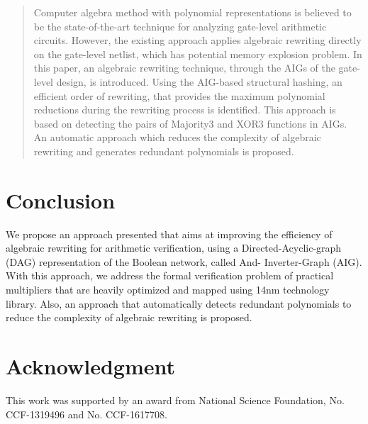 \documentclass[journal]{IEEEtran}
\begin{document}
\begin{abstract}
Computer algebra method with polynomial representations is believed to be the state-of-the-art technique for analyzing gate-level arithmetic circuits. However, the existing approach applies algebraic rewriting directly on the gate-level netlist, which has potential memory explosion problem. In this paper, an algebraic rewriting technique, through the AIGs of the gate-level design, is introduced. Using the AIG-based structural hashing, an efficient order of rewriting, that provides the maximum polynomial reductions during the rewriting process is identified. This approach is based on detecting the pairs of Majority3 and XOR3 functions in AIGs. An automatic approach which reduces the complexity of algebraic rewriting and generates redundant polynomials is proposed. 
\end{abstract}






\maketitle

\IEEEdisplaynontitleabstractindextext

\IEEEpeerreviewmaketitle

\vspace{-3mm}

\section{Conclusion}
We propose an approach presented that aims at improving the efficiency of algebraic rewriting for arithmetic verification, using a Directed-Acyclic-graph (DAG) representation of the Boolean network, called And- Inverter-Graph (AIG). With this approach, we address the formal verification problem of practical multipliers that are heavily optimized and mapped using 14nm technology library. Also, an approach that automatically detects redundant polynomials to reduce the complexity of algebraic rewriting is proposed.


\section*{Acknowledgment}
This work was supported by an award from National Science Foundation, No. CCF-1319496 and No. CCF-1617708. 





\end{document}
